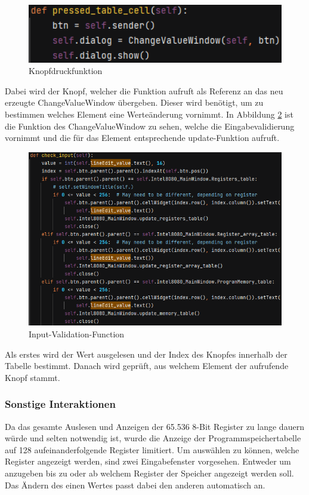 \documentclass[12pt]{article}
\newcommand{\imgSpaceBefore}{\vspace{10pt}}
\begin{document}
\begin{figure}[H]
\centering
\includegraphics[width=12cm]{bilder/PTC}
\caption{Knopfdruckfunktion}
\label{fig:PTC}
\end{figure}

\noindent
Dabei wird der Knopf, welcher die Funktion aufruft als Referenz an das neu erzeugte ChangeValueWindow übergeben. Dieser wird benötigt, um zu bestimmen welches Element eine Werteänderung vornimmt. In Abbildung \ref{fig:CheckInput} ist die Funktion des ChangeValueWindow zu sehen, welche die Eingabevalidierung vornimmt und die für das Element entsprechende \glqq update\grqq-Funktion aufruft.\imgSpaceBefore

\begin{figure}[H]
\centering
\includegraphics[width=12cm]{bilder/CheckInput}
\caption{Input-Validation-Function}
\label{fig:CheckInput}
\end{figure}

\noindent
Als erstes wird der Wert ausgelesen und der Index des Knopfes innerhalb der Tabelle bestimmt. Danach wird geprüft, aus welchem Element der aufrufende Knopf stammt.

\subsubsection{Sonstige Interaktionen}
Da das gesamte Auslesen und Anzeigen der 65.536 8-Bit Register zu lange dauern würde und selten notwendig ist, wurde die Anzeige der Programmspeichertabelle auf 128 aufeinanderfolgende Register limitiert. Um auswählen zu können, welche Register angezeigt werden, sind zwei Eingabefenster vorgesehen. Entweder um anzugeben bis zu oder ab welchem Register der Speicher angezeigt werden soll. Das Ändern des einen Wertes passt dabei den anderen automatisch an.\imgSpaceBefore
\end{document}
